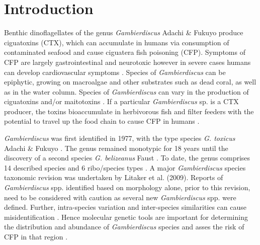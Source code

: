 \documentclass[12pt]{article}
\begin{document}
\newpage
\section*{Introduction}
Benthic dinoflagellates of the genus \emph{Gambierdiscus} Adachi \& Fukuyo produce ciguatoxins (CTX), which can accumulate in humans via consumption of contaminated seafood and cause ciguatera fish poisoning (CFP). Symptoms of CFP are largely gastrointestinal and neurotoxic however in severe cases humans can develop cardiovascular symptoms \cite{sims1987theoretical}. Species of \emph{Gambierdiscus} can be epiphytic, growing on macroalgae and other substrates such as dead coral, as well as in the water column. Species of \textit{Gambierdiscus} can vary in the production of ciguatoxins and/or maitotoxins \cite{chinain2010ciguatera,kohli2014high}. If a particular \emph{Gambierdiscus} sp. is a CTX producer, the toxins bioaccumulate in herbivorous fish and filter feeders with the potential to travel up the food chain to cause CFP in humans  \citep{chinain1997intraspecific,holmes1998gambierdiscus}. %

\emph{Gambierdiscus} was first identified in 1977, with the type species \emph{G. toxicus} Adachi \& Fukuyo \citep{adachi1979thecal}. The genus remained monotypic for 18 years until the discovery of a second species \emph{G. belizeanus} Faust \citep{faust1995observation}. To date, the genus comprises 14 described species and 6 ribo/species types
 \citep{smith2016new,fraga2016gambierdiscus,litaker2010global,adachi1979thecal,faust1995observation,chinain1999morphology,litaker2009taxonomy,dai2017taxonomic,nishimura2014morphology,rhodes2017new,kretzschmar2016characterization,fraga2011gambierdiscus,xu2014distribution,fraga2014genus} .
A major \emph{Gambierdiscus} species taxonomic revision was undertaken by Litaker et al. (2009). Reports of \emph{Gambierdiscus} spp. identified based on morphology alone, prior to this revision, need to be considered with caution as several new \emph{Gambierdiscus} spp. were defined. Further, intra-species variation and inter-species similarities can cause misidentification \citep{bravo2014cellular,kretzschmar2016characterization,kohli2014high}. Hence molecular genetic tools are important for determining the distribution and abundance of  \textit{Gambierdiscus} species and asses the risk of CFP in that region \citep{kohli2014high,kretzschmar2016characterization}. \\
\end{document}
